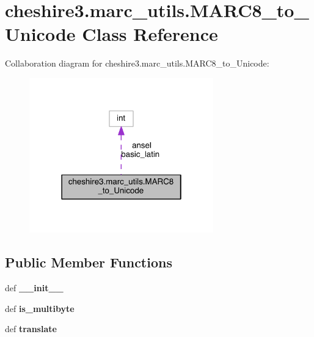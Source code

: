 \hypertarget{classcheshire3_1_1marc__utils_1_1_m_a_r_c8__to___unicode}{\section{cheshire3.\-marc\-\_\-utils.\-M\-A\-R\-C8\-\_\-to\-\_\-\-Unicode Class Reference}
\label{classcheshire3_1_1marc__utils_1_1_m_a_r_c8__to___unicode}
}


Collaboration diagram for cheshire3.\-marc\-\_\-utils.\-M\-A\-R\-C8\-\_\-to\-\_\-\-Unicode\-:
\nopagebreak
\begin{figure}[H]
\begin{center}
\leavevmode
\includegraphics[width=226pt]{classcheshire3_1_1marc__utils_1_1_m_a_r_c8__to___unicode__coll__graph}
\end{center}
\end{figure}
\subsection*{Public Member Functions}
\begin{DoxyCompactItemize}
\item 
\hypertarget{classcheshire3_1_1marc__utils_1_1_m_a_r_c8__to___unicode_a7b2901a2945ba69664dc21ff480522a4}{def {\bfseries \-\_\-\-\_\-init\-\_\-\-\_\-}}\label{classcheshire3_1_1marc__utils_1_1_m_a_r_c8__to___unicode_a7b2901a2945ba69664dc21ff480522a4}

\item 
\hypertarget{classcheshire3_1_1marc__utils_1_1_m_a_r_c8__to___unicode_a9cc77f031be692a01468b78ec1a9cdfc}{def {\bfseries is\-\_\-multibyte}}\label{classcheshire3_1_1marc__utils_1_1_m_a_r_c8__to___unicode_a9cc77f031be692a01468b78ec1a9cdfc}

\item 
\hypertarget{classcheshire3_1_1marc__utils_1_1_m_a_r_c8__to___unicode_a51844ed8d72bb87ec75fd7879fc80e2f}{def {\bfseries translate}}\label{classcheshire3_1_1marc__utils_1_1_m_a_r_c8__to___unicode_a51844ed8d72bb87ec75fd7879fc80e2f}

\end{DoxyCompactItemize}
